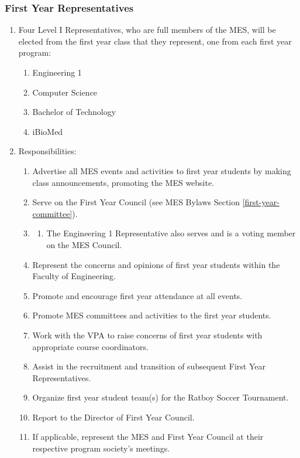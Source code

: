 \subsubsection{First Year
 Representatives}
\label{first-year-representatives}
\begin{enumerate}
 \item
  Four Level I Representatives, who are full members of the MES, will be elected from the first year class that they represent, one from each first year program:

  \begin{enumerate}
   \item
    Engineering 1
   \item
    Computer Science
   \item
    Bachelor of Technology
   \item
    iBioMed
  \end{enumerate}
 \item
  Responsibilities:

  \begin{enumerate}
   \item
    Advertise all MES events and activities to first year students by making class announcements, promoting the MES website.
   \item
    Serve on the First Year Council (see MES Bylaws Section \ref{first-year-committee}).
   \item
    \begin{enumerate}
     \item
      The Engineering 1 Representative also serves and is a voting member on the MES Council.
    \end{enumerate}
   \item
    Represent the concerns and opinions of first year students within the Faculty of Engineering.
   \item
    Promote and encourage first year attendance at all events.
   \item
    Promote MES committees and activities to the first year students.
   \item
    Work with the VPA to raise concerns of first year students with appropriate course coordinators.
   \item
    Assist in the recruitment and transition of subsequent First Year Representatives.
   \item
    Organize first year student team(s) for the Ratboy Soccer Tournament.
   \item
    Report to the Director of First Year Council.
   \item
    If applicable, represent the MES and First Year Council at their respective program society's meetings.
  \end{enumerate}
\end{enumerate}

